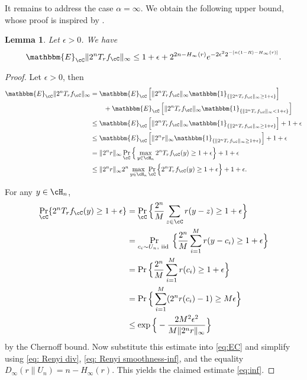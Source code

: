 \documentclass{amsart}
\newtheorem{lemma}[theorem]{Lemma}
\theoremstyle{remark}
\begin{document}
It remains to address the case $\alpha =\infty$. We obtain the following upper bound, whose proof is inspired by \cite{yu2018renyi}.

\begin{lemma}\label{lemma: D_inf(T_r|U) ach.}
Let $\epsilon >0$. We have
    \begin{align}\label{eq:inf}
        \mathbbm{E}_{\cC} \|2^nT_rf_\cC\|_\infty \leq 1+\epsilon+ 2^{2n-H_{\infty}(r)}e^{-2\epsilon^2 2^{-[n(1-R)-H_{\infty}(r)]}}.
    \end{align}
\end{lemma}

\begin{proof} 
Let $\epsilon >0$, then
\begin{align}
   \mathbbm{E}_{\cC} \|2^nT_rf_\cC\|_{\infty}
    &= \mathbbm{E}_{\cC} \left[\|2^nT_rf_\cC\|_{\infty}\mathbbm{1}_{\{\|2^nT_rf_\cC\|_{\infty} \geq 1+ \epsilon\}}\right]\notag \\
    & \quad \quad + \mathbbm{E}_{\cC} \left[\|2^nT_rf_\cC\|_{\infty}\mathbbm{1}_{\{\|2^nT_rf_\cC\|_{\infty} < 1+ \epsilon\}}\right]\notag \\
    & \leq \mathbbm{E}_{\cC} \left[\|2^nT_rf_\cC\|_{\infty}\mathbbm{1}_{\{\|2^nT_rf_\cC\|_{\infty} \geq 1+ \epsilon\}}\right]+ 1+\epsilon\notag \\
    & \leq \mathbbm{E}_{\cC} \left[\|2^nr\|_{\infty}\mathbbm{1}_{\{\|2^nT_rf_\cC\|_{\infty} \geq 1+ \epsilon\}}\right]+ 1+\epsilon\notag \\
    & = \|2^nr\|_{\infty}\Pr_{\cC} \Big\{\max_{y \in \cH_n}2^nT_rf_\cC(y) \geq 1+ \epsilon\Big\}+ 1+\epsilon\notag \\
    & \leq\|2^nr\|_{\infty}2^n\max_{y \in \cH_n}\Pr_{\cC} \Big\{2^nT_rf_\cC(y) \geq 1+ \epsilon\Big\}+ 1+\epsilon. \label{eq:EC}
\end{align}

For any $y \in \cH_n$,
\begin{align*}
    \Pr_{\cC} \{2^nT_rf_\cC(y) \geq 1+ \epsilon\} &= \Pr_{\cC} \Big\{\frac{2^n}{M}\sum_{z \in \cC}r(y-z) \geq 1+ \epsilon\Big\}  \\
    &= \Pr_{c_i \sim U_n, \text{ iid }} \Big\{\frac{2^n}{M}\sum_{i =1}^Mr(y-c_i) \geq 1+ \epsilon\Big\} \\
    &= \Pr \Big\{\frac{2^n}{M}\sum_{i =1}^Mr(c_i) \geq 1+ \epsilon\Big\}\\
    &= \Pr \Big\{\sum_{i =1}^M(2^nr(c_i)-1) \geq M{\epsilon}\Big\} \\
    & \leq \exp\Big\{-\frac{2M^2\epsilon^2}{ M\|2^nr\|_{\infty}}\Big\}
\end{align*}
by the Chernoff bound. Now substitute this estimate into \eqref{eq:EC} and
simplify using \eqref{eq: Renyi div}, \eqref{eq: Renyi smoothness-inf}, and the equality $D_\infty(r\|U_n)=n-H_\infty(r).$ This yields the claimed estimate \eqref{eq:inf}.
\end{proof}
\end{document}
